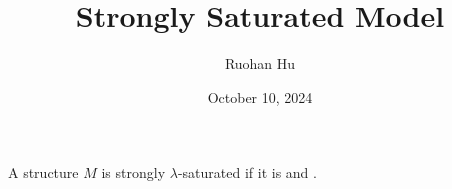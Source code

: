 \documentclass[a4paper]{article}
\title{Strongly Saturated Model}
\date{October 10, 2024}
\author{Ruohan Hu}
\begin{document}
\maketitle
{



}\par{
    A structure \(M\) is strongly \(\lambda\)-saturated if it is  and .
}
\printbibliography
\end{document}
